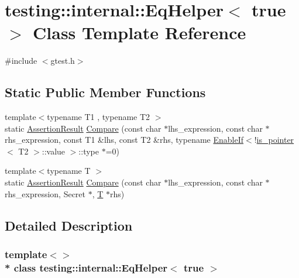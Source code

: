 \hypertarget{classtesting_1_1internal_1_1_eq_helper_3_01true_01_4}{}\section{testing\+:\+:internal\+:\+:Eq\+Helper$<$ true $>$ Class Template Reference}
\label{classtesting_1_1internal_1_1_eq_helper_3_01true_01_4}


{\ttfamily \#include $<$gtest.\+h$>$}

\subsection*{Static Public Member Functions}
\begin{DoxyCompactItemize}
\item 
{\footnotesize template$<$typename T1 , typename T2 $>$ }\\static \hyperlink{classtesting_1_1_assertion_result}{Assertion\+Result} \hyperlink{classtesting_1_1internal_1_1_eq_helper_3_01true_01_4_a12c7194b2a210b61f06c912eef484ca6}{Compare} (const char $\ast$lhs\+\_\+expression, const char $\ast$rhs\+\_\+expression, const T1 \&lhs, const T2 \&rhs, typename \hyperlink{structtesting_1_1internal_1_1_enable_if}{Enable\+If}$<$!\hyperlink{structtesting_1_1internal_1_1is__pointer}{is\+\_\+pointer}$<$ T2 $>$\+::value $>$\+::type $\ast$=0)
\item 
{\footnotesize template$<$typename T $>$ }\\static \hyperlink{classtesting_1_1_assertion_result}{Assertion\+Result} \hyperlink{classtesting_1_1internal_1_1_eq_helper_3_01true_01_4_a6f292601a68c8f0d49e6d48bd309b900}{Compare} (const char $\ast$lhs\+\_\+expression, const char $\ast$rhs\+\_\+expression, Secret $\ast$, \hyperlink{functions__7_8js_adf1f3edb9115acb0a1e04209b7a9937b}{T} $\ast$rhs)
\end{DoxyCompactItemize}


\subsection{Detailed Description}
\subsubsection*{template$<$$>$\\*
class testing\+::internal\+::\+Eq\+Helper$<$ true $>$}



